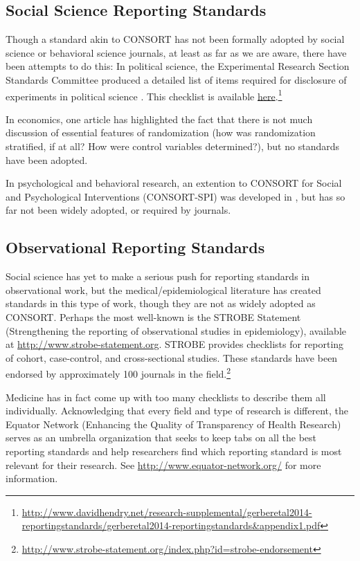 \documentclass[12pt] {article}
\begin{document}
\subsection{Social Science Reporting Standards}\label{soc-sci-standards}
Though a standard akin to CONSORT has not been formally adopted by social science or behavioral science journals, at least as far as we are aware, there have been attempts to do this: In political science, the Experimental Research Section Standards Committee produced a detailed list of items required for disclosure of experiments in political science \citep{gerber_reporting_????}. This checklist is available \href{http://www.davidhendry.net/research-supplemental/gerberetal2014-reportingstandards/gerberetal2014-reportingstandards&appendix1.pdf}{here}.\footnote{\url{http://www.davidhendry.net/research-supplemental/gerberetal2014-reportingstandards/gerberetal2014-reportingstandards&appendix1.pdf}}

In economics, one article has highlighted the fact that there is not much discussion of essential features of randomization (how was randomization stratified, if at all? How were control variables determined?), but no standards have been adopted. \citep{bruhn_pursuit_2009}

In psychological and behavioral research, an extention to CONSORT for Social and Psychological Interventions (CONSORT-SPI) was developed in \citep{montgomery2013protocol}, but has so far not been widely adopted, or required by journals. 

\subsection{Observational Reporting Standards}\label{observational-standards}
Social science has yet to make a serious push for reporting standards in observational work, but the medical/epidemiological literature has created standards in this type of work, though they are not as widely adopted as CONSORT. Perhaps the most well-known is the STROBE Statement (Strengthening the reporting of observational studies in epidemiology), available at \url{http://www.strobe-statement.org}. STROBE provides checklists for reporting of cohort, case-control, and cross-sectional studies. These standards have been endorsed by approximately 100 journals in the field.\footnote{\url{http://www.strobe-statement.org/index.php?id=strobe-endorsement}}

Medicine has in fact come up with too many checklists to describe them all individually. Acknowledging that every field and type of research is different, the Equator Network (Enhancing the Quality of Transparency of Health Research) serves as an umbrella organization that seeks to keep tabs on all the best reporting standards and help researchers find which reporting standard is most relevant for their research. See \url{http://www.equator-network.org/} for more information.
\end{document}
